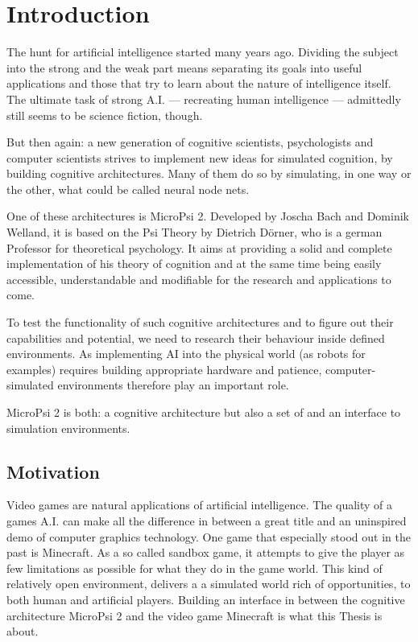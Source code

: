 \chapter{Introduction}
The hunt for artificial intelligence started many years ago. Dividing the subject into the strong and the weak part means separating its goals into useful applications and those that try to learn about the nature of intelligence itself. The ultimate task of strong A.I. --- recreating human intelligence --- admittedly still seems to be science fiction, though.

But then again: a new generation of cognitive scientists, psychologists and computer scientists strives to implement new ideas for simulated cognition, by building cognitive architectures. Many of them do so by simulating, in one way or the other, what could be called neural node nets.

One of these architectures is MicroPsi 2. Developed by Joscha Bach and Dominik Welland, it is based on the Psi Theory by Dietrich Dörner, who is a german Professor for theoretical psychology. It aims at providing a solid and complete implementation of his theory of cognition and at the same time being easily accessible, understandable and modifiable for the research and applications to come.

To test the functionality of such cognitive architectures and to figure out their capabilities and potential, we need to research their behaviour inside defined environments. As implementing AI into the physical world (as robots for examples) requires building appropriate hardware and patience, computer-simulated environments therefore play an important role.

MicroPsi 2 is both: a cognitive architecture but also a set of and an interface to simulation environments.

\section{Motivation}
Video games are natural applications of artificial intelligence. The quality of a games A.I. can make all the difference in between a great title and an uninspired demo of computer graphics technology. One game that especially stood out in the past is Minecraft. As a so called sandbox game, it attempts to give the player as few limitations as possible for what they do in the game world. This kind of relatively open environment, delivers a a simulated world rich of opportunities, to both human and artificial players. Building an interface in between the cognitive architecture MicroPsi 2 and the video game Minecraft is what this Thesis is about.


